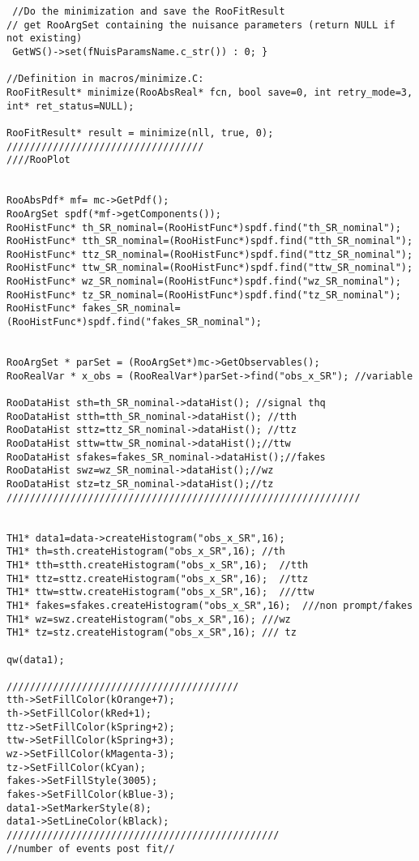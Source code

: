 \begin{verbatim}
 //Do the minimization and save the RooFitResult
// get RooArgSet containing the nuisance parameters (return NULL if not existing)
 GetWS()->set(fNuisParamsName.c_str()) : 0; }

//Definition in macros/minimize.C:
RooFitResult* minimize(RooAbsReal* fcn, bool save=0, int retry_mode=3, int* ret_status=NULL);

RooFitResult* result = minimize(nll, true, 0);
//////////////////////////////////
////RooPlot


RooAbsPdf* mf= mc->GetPdf();
RooArgSet spdf(*mf->getComponents());
RooHistFunc* th_SR_nominal=(RooHistFunc*)spdf.find("th_SR_nominal");
RooHistFunc* tth_SR_nominal=(RooHistFunc*)spdf.find("tth_SR_nominal");
RooHistFunc* ttz_SR_nominal=(RooHistFunc*)spdf.find("ttz_SR_nominal");
RooHistFunc* ttw_SR_nominal=(RooHistFunc*)spdf.find("ttw_SR_nominal");
RooHistFunc* wz_SR_nominal=(RooHistFunc*)spdf.find("wz_SR_nominal");
RooHistFunc* tz_SR_nominal=(RooHistFunc*)spdf.find("tz_SR_nominal");
RooHistFunc* fakes_SR_nominal=(RooHistFunc*)spdf.find("fakes_SR_nominal");


RooArgSet * parSet = (RooArgSet*)mc->GetObservables();
RooRealVar * x_obs = (RooRealVar*)parSet->find("obs_x_SR"); //variable

RooDataHist sth=th_SR_nominal->dataHist(); //signal thq
RooDataHist stth=tth_SR_nominal->dataHist(); //tth
RooDataHist sttz=ttz_SR_nominal->dataHist(); //ttz
RooDataHist sttw=ttw_SR_nominal->dataHist();//ttw
RooDataHist sfakes=fakes_SR_nominal->dataHist();//fakes
RooDataHist swz=wz_SR_nominal->dataHist();//wz
RooDataHist stz=tz_SR_nominal->dataHist();//tz
/////////////////////////////////////////////////////////////


TH1* data1=data->createHistogram("obs_x_SR",16);
TH1* th=sth.createHistogram("obs_x_SR",16); //th
TH1* tth=stth.createHistogram("obs_x_SR",16);  //tth
TH1* ttz=sttz.createHistogram("obs_x_SR",16);  //ttz
TH1* ttw=sttw.createHistogram("obs_x_SR",16);  ///ttw
TH1* fakes=sfakes.createHistogram("obs_x_SR",16);  ///non prompt/fakes
TH1* wz=swz.createHistogram("obs_x_SR",16); ///wz
TH1* tz=stz.createHistogram("obs_x_SR",16); /// tz

qw(data1);

////////////////////////////////////////
tth->SetFillColor(kOrange+7);
th->SetFillColor(kRed+1);
ttz->SetFillColor(kSpring+2);
ttw->SetFillColor(kSpring+3);
wz->SetFillColor(kMagenta-3);
tz->SetFillColor(kCyan);
fakes->SetFillStyle(3005);
fakes->SetFillColor(kBlue-3);
data1->SetMarkerStyle(8);
data1->SetLineColor(kBlack);
///////////////////////////////////////////////
//number of events post fit//


\end{verbatim}
